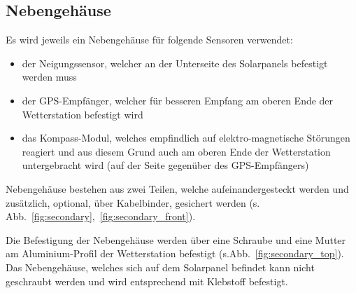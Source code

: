 \subsection{Nebengehäuse}\label{sec:ge_neben}
Es wird jeweils ein Nebengehäuse für folgende Sensoren verwendet:
\begin{itemize}
\item der Neigungssensor, welcher an der Unterseite des Solarpanels befestigt werden muss
\item der GPS-Empfänger, welcher für besseren Empfang am oberen Ende der Wetterstation befestigt wird
\item das Kompass-Modul, welches empfindlich auf elektro-magnetische Störungen reagiert und aus diesem Grund auch am oberen Ende der Wetterstation untergebracht wird (auf der Seite gegenüber des GPS-Empfängers)
\end{itemize}
Nebengehäuse bestehen aus zwei Teilen, welche aufeinandergesteckt werden und zusätzlich, optional, über Kabelbinder, gesichert werden (s. Abb.~\ref{fig:secondary},~\ref{fig:secondary_front}).

Die Befestigung der Nebengehäuse werden über eine Schraube und eine Mutter am Aluminium-Profil der Wetterstation befestigt (s.Abb.~\ref{fig:secondary_top}). Das Nebengehäuse, welches sich auf dem Solarpanel befindet kann nicht geschraubt werden und wird entsprechend mit Klebstoff befestigt.

